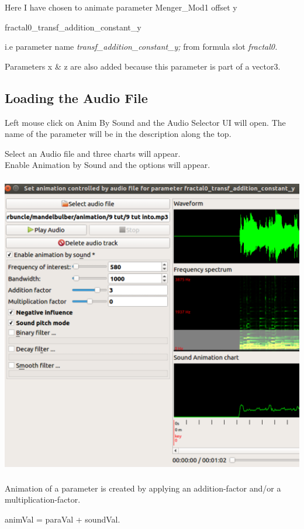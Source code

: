 Here I have chosen to animate parameter Menger\_Mod1 offset y

fractal0\_transf\_addition\_constant\_y

i.e parameter name \emph{transf\_addition\_constant\_y;} from formula
slot \emph{fractal0.}

Parameters x \& z are also added because this parameter is part of a
vector3.

\subsection{Loading the Audio File}\label{loading-the-audio-file}

Left mouse click on Anim By Sound and the Audio Selector UI will open.
The name of the parameter will be in the description along the top.

Select an Audio file and three charts will appear.\\
Enable Animation by Sound and the options will appear.

\includegraphics[width=5.42000in,height=5.21000in]{img/sound/media/image4.png}

Animation of a parameter is created by applying an addition-factor
and/or a multiplication-factor.

animVal = paraVal + soundVal.

